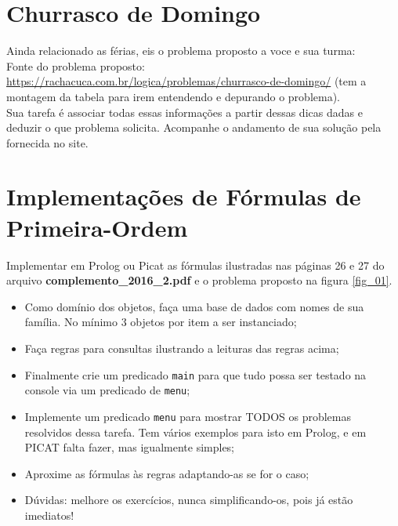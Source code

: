 \documentclass[a4paper,12pt]{article}
\begin{document}
\section{Churrasco de Domingo}

Ainda relacionado as férias, eis o problema proposto a voce e sua turma:\\
 Fonte do problema proposto:\\
 \url{https://rachacuca.com.br/logica/problemas/churrasco-de-domingo/}
 (tem a montagem da tabela para irem entendendo e depurando o problema).\\


\vspace{1.5cm}
 Sua tarefa é associar todas essas informações a partir dessas dicas dadas e deduzir o que problema solicita. Acompanhe o andamento de sua solução pela fornecida no site.
\newpage
\section{Implementações de Fórmulas de Primeira-Ordem}

Implementar em Prolog ou Picat as fórmulas ilustradas nas páginas
26 e 27 do arquivo   \textbf{complemento\_2016\_2.pdf} e o problema proposto 
na figura \ref{fig_01}.
 \begin{itemize}
   \item Como domínio dos objetos, faça uma base de dados com nomes de sua família.
   No mínimo 3 objetos por item a ser instanciado;
   
   \item Faça regras para consultas ilustrando a leituras das regras acima;
   
   \item Finalmente crie um predicado \texttt{main} para que tudo possa ser testado na console via um predicado de \texttt{menu};
   
   \item Implemente um predicado \texttt{menu} para mostrar TODOS os problemas resolvidos dessa tarefa. Tem vários exemplos para isto em Prolog, e em PICAT falta fazer, mas igualmente simples;
   
   \item Aproxime as fórmulas às regras adaptando-as se for o caso;
   
   \item Dúvidas: melhore os exercícios, nunca simplificando-os, pois já estão imediatos!
 
 \end{itemize}
\end{document}
